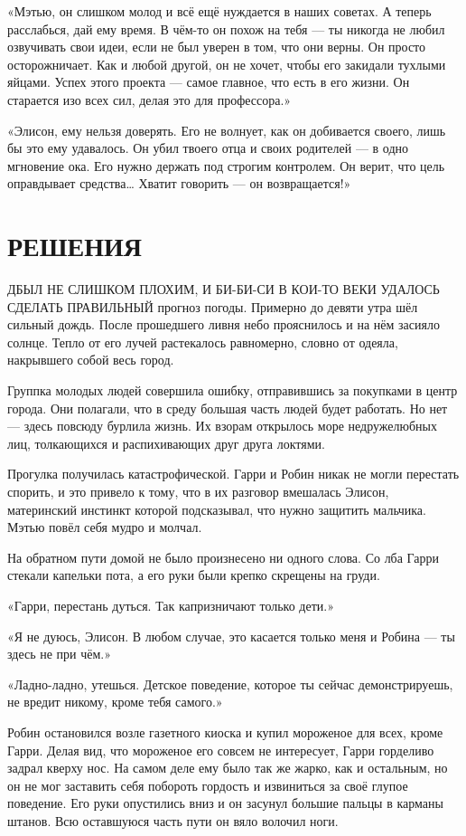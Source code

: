 \documentclass[a5paper, 9pt,
final, openany, twoside=true]{memoir}
\begin{document}
«Мэтью, он слишком молод и всё ещё нуждается в наших советах. А теперь расслабься, дай ему время. В чём-то он похож на тебя — ты никогда не любил озвучивать свои идеи, если не был уверен в том, что они верны. Он просто осторожничает. Как и любой другой, он не хочет, чтобы его закидали тухлыми яйцами. Успех этого проекта — самое главное, что есть в его жизни. Он старается изо всех сил, делая это для профессора.»

«Элисон, ему нельзя доверять. Его не волнует, как он добивается своего, лишь бы это ему удавалось. Он убил твоего отца и своих родителей — в одно мгновение ока. Его нужно держать под строгим контролем. Он верит, что цель оправдывает средства… Хватит говорить — он возвращается!»
\chapter{РЕШЕНИЯ}
Д{ БЫЛ НЕ СЛИШКОМ ПЛОХИМ, И БИ-БИ-СИ В КОИ-ТО ВЕКИ УДАЛОСЬ СДЕЛАТЬ ПРАВИЛЬНЫЙ} прогноз погоды. Примерно до девяти утра шёл сильный дождь. После прошедшего ливня небо прояснилось и на нём засияло солнце. Тепло от его лучей растекалось равномерно, словно от одеяла, накрывшего собой весь город.

Группка молодых людей совершила ошибку, отправившись за покупками в центр города. Они полагали, что в среду большая часть людей будет работать. Но нет — здесь повсюду бурлила жизнь. Их взорам открылось море недружелюбных лиц, толкающихся и распихивающих друг друга локтями.\bigskip

Прогулка получилась катастрофической. Гарри и Робин никак не могли перестать спорить, и это привело к тому, что в их разговор вмешалась Элисон, материнский инстинкт которой подсказывал, что нужно защитить мальчика. Мэтью повёл себя мудро и молчал.

На обратном пути домой не было произнесено ни одного слова. Со лба Гарри стекали капельки пота, а его руки были крепко скрещены на груди.

«Гарри, перестань дуться. Так капризничают только дети.»

«Я не дуюсь, Элисон. В любом случае, это касается только меня и Робина — ты здесь не при чём.»

«Ладно-ладно, утешься. Детское поведение, которое ты сейчас демонстрируешь, не вредит никому, кроме тебя самого.»

Робин остановился возле газетного киоска и купил мороженое для всех, кроме Гарри. Делая вид, что мороженое его совсем не интересует, Гарри горделиво задрал кверху нос. На самом деле ему было так же жарко, как и остальным, но он не мог заставить себя побороть гордость и извиниться за своё глупое поведение. Его руки опустились вниз и он засунул большие пальцы в карманы штанов. Всю оставшуюся часть пути он вяло волочил ноги.
\end{document}

